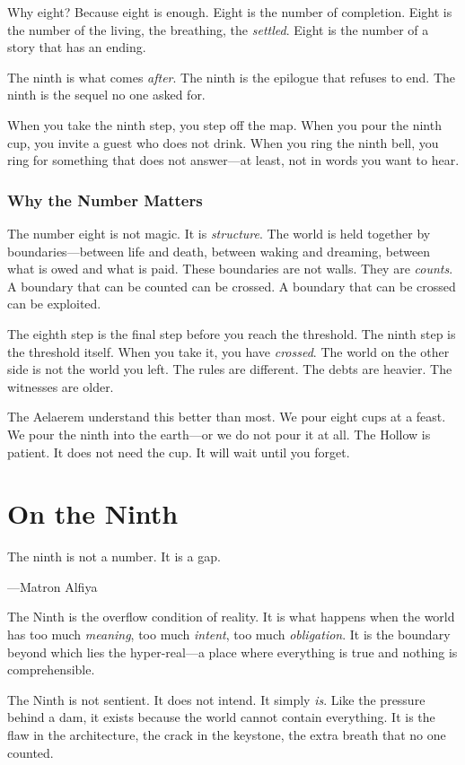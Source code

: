 \documentclass[11pt]{book}
\begin{document}
Why eight? Because eight is enough. Eight is the number of completion. Eight is the number of the living, the breathing, the \textit{settled}. Eight is the number of a story that has an ending.

The ninth is what comes \textit{after}. The ninth is the epilogue that refuses to end. The ninth is the sequel no one asked for.

When you take the ninth step, you step off the map. When you pour the ninth cup, you invite a guest who does not drink. When you ring the ninth bell, you ring for something that does not answer---at least, not in words you want to hear.

\subsection{Why the Number Matters}

The number eight is not magic. It is \textit{structure}. The world is held together by boundaries---between life and death, between waking and dreaming, between what is owed and what is paid. These boundaries are not walls. They are \textit{counts}. A boundary that can be counted can be crossed. A boundary that can be crossed can be exploited.

The eighth step is the final step before you reach the threshold. The ninth step is the threshold itself. When you take it, you have \textit{crossed}. The world on the other side is not the world you left. The rules are different. The debts are heavier. The witnesses are older.

The Aelaerem understand this better than most. We pour eight cups at a feast. We pour the ninth into the earth---or we do not pour it at all. The Hollow is patient. It does not need the cup. It will wait until you forget.

\chapter{On the Ninth}

\epigraph{The ninth is not a number. It is a gap.}{---Matron Alfiya}

The Ninth is the overflow condition of reality. It is what happens when the world has too much \textit{meaning}, too much \textit{intent}, too much \textit{obligation}. It is the boundary beyond which lies the hyper-real---a place where everything is true and nothing is comprehensible.

The Ninth is not sentient. It does not intend. It simply \textit{is}. Like the pressure behind a dam, it exists because the world cannot contain everything. It is the flaw in the architecture, the crack in the keystone, the extra breath that no one counted.
\end{document}
